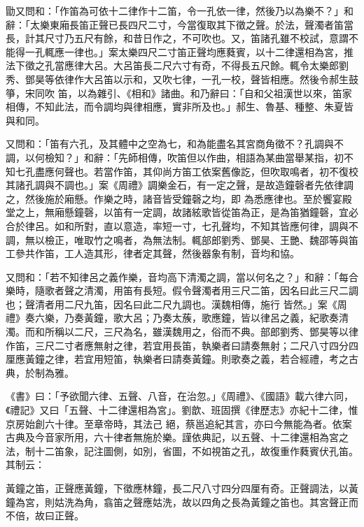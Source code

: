 \begin{pinyinscope}
 勖又問和：「作笛為可依十二律作十二笛，令一孔依一律，然後乃以為樂不？」和辭：「太樂東廂長笛正聲已長四尺二寸，今當復取其下徵之聲。於法，聲濁者笛當長，計其尺寸乃五尺有餘，和昔日作之，不可吹也。又，笛諸孔雖不校試，意謂不能得一孔輒應一律也。」案太樂四尺二寸笛正聲均應蕤賓，以十二律還相為宮，推法下徵之孔當應律大呂。大呂笛長二尺六寸有奇，不得長五尺餘。輒令太樂郎劉秀、鄧昊等依律作大呂笛以示和，又吹七律，一孔一校，聲皆相應。然後令郝生鼓箏，宋同吹
 笛，以為雜引、《相和》諸曲。和乃辭曰：「自和父祖漢世以來，笛家相傳，不知此法，而令調均與律相應，實非所及也。」郝生、魯基、種整、朱夏皆與和同。



 又問和：「笛有六孔，及其體中之空為七，和為能盡名其宮商角徵不？孔調與不調，以何檢知？」和辭：「先師相傳，吹笛但以作曲，相語為某曲當舉某指，初不知七孔盡應何聲也。若當作笛，其仰尚方笛工依案舊像訖，但吹取鳴者，初不復校其諸孔調與不調也。」案《周禮》調樂金石，有一定之聲，是故造鐘磬者先依律調之，然後施於廂懸。作樂之時，諸音皆受鐘磬之均，即
 為悉應律也。至於饗宴殿堂之上，無廂懸鐘磬，以笛有一定調，故諸絃歌皆從笛為正，是為笛猶鐘磬，宜必合於律呂。如和所對，直以意造，率短一寸，七孔聲均，不知其皆應何律，調與不調，無以檢正，唯取竹之鳴者，為無法制。輒部郎劉秀、鄧昊、王艷、魏邵等與笛工參共作笛，工人造其形，律者定其聲，然後器象有制，音均和協。



 又問和：「若不知律呂之義作樂，音均高下清濁之調，當以何名之？」和辭：「每合樂時，隨歌者聲之清濁，用笛有長短。假令聲濁者用三尺二笛，因名曰此三尺二調也；聲清者用二尺九笛，因名曰此二尺九調也。漢魏相傳，施行
 皆然。」案《周禮》奏六樂，乃奏黃鐘，歌大呂；乃奏太蔟，歌應鐘，皆以律呂之義，紀歌奏清濁。而和所稱以二尺，三尺為名，雖漢魏用之，俗而不典。部郎劉秀、鄧昊等以律作笛，三尺二寸者應無射之律，若宜用長笛，執樂者曰請奏無射；二尺八寸四分四厘應黃鐘之律，若宜用短笛，執樂者曰請奏黃鐘。則歌奏之義，若合經禮，考之古典，於制為雅。



 《書》曰：「予欲聞六律、五聲、八音，在治忽。」《周禮》、《國語》載六律六同，《禮記》又曰「五聲、十二律還相為宮」。劉歆、班固撰《律歷志》亦紀十二律，惟京房始創六十律。至章帝時，其法己
 絕，蔡邕追紀其言，亦曰今無能為者。依案古典及今音家所用，六十律者無施於樂。謹依典記，以五聲、十二律還相為宮之法，制十二笛象，記注圖側，如別，省圖，不如視笛之孔，故復重作蕤賓伏孔笛。其制云：



 黃鐘之笛，正聲應黃鐘，下徵應林鐘，長二尺八寸四分四厘有奇。正聲調法，以黃鐘為宮，則姑洗為角，翕笛之聲應姑洗，故以四角之長為黃鐘之笛也。其宮聲正而不倍，故曰正聲。




\end{pinyinscope}
